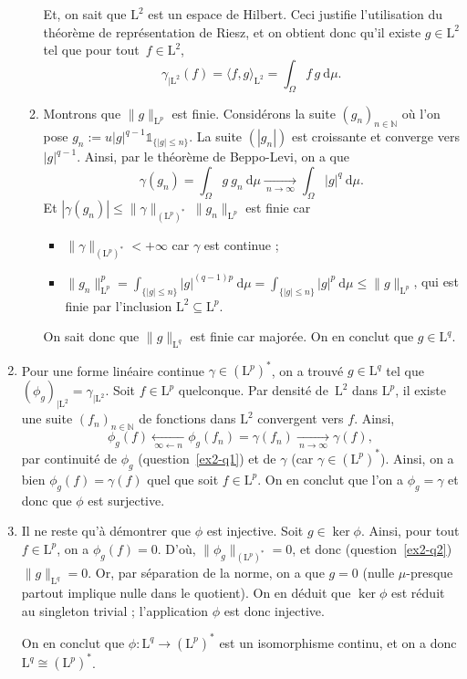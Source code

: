 \documentclass{../../td}
\begin{document}
\begin{enumerate}
\begin{enumerate}
          Et, on sait que  $\mathrm{L}^2$ est un espace de Hilbert.
          Ceci justifie l'utilisation du théorème de représentation de Riesz, et on obtient donc qu'il existe $g \in \mathrm{L}^2$ tel que pour tout~$f \in \mathrm{L}^2$, \[
          \gamma_{|\mathrm{L}^2}(f) = \langle f, g \rangle_{\mathrm{L}^2} = \int_\Omega f\,g\:\mathrm{d}\mu
          .\]
        \item Montrons que $\|g\|_{\mathrm{L}^p}$ est finie.
          Considérons la suite $(g_n)_{n \in \mathds{N}}$ où l'on pose $g_n := u|g|^{q-1} \mathds{1}_{\{|g|\le n\}}$.
          La suite $(|g_n|)$ est croissante et converge vers $|g|^{q-1}$.
          Ainsi, par le théorème de Beppo-Levi, on a que \[
            \gamma(g_n) = \int_\Omega g\:g_n~\mathrm{d}\mu \xrightarrow[\:n\to \infty\:]{}\int_\Omega |g|^q~\mathrm{d}\mu
          .\]
          Et $|\gamma(g_n)| \le \|\gamma\|_{(\mathrm{L}^p)^*}\: \|g_n\|_{\mathrm{L}^p}$ est finie car 
          \begin{itemize}
            \item $\|\gamma\|_{(\mathrm{L}^p)^*} < +\infty$ car $\gamma$ est continue ;
            \item $\|g_n\|_{\mathrm{L}^p}^{p} = \int_{\{|g| \le n\}} |g|^{(q-1)p}\:\mathrm{d}\mu = \int_{\{|g|\le n\}} |g|^p\:\mathrm{d}\mu \le \|g\|_{\mathrm{L}^p}$, qui est finie par l'inclusion $\mathrm{L}^2 \subseteq \mathrm{L}^p$.
          \end{itemize}
          On sait donc que $\|g\|_{\mathrm{L}^q}$ est finie car majorée.
          On en conclut que $g \in \mathrm{L}^q$.
      \end{enumerate}
    \item Pour une forme linéaire continue $\gamma \in (\mathrm{L}^p)^*$, on a trouvé $g \in \mathrm{L}^q$ tel que $(\phi_g)_{|\mathrm{L}^2} = \gamma_{|\mathrm{L}^2}$.
      Soit $f \in \mathrm{L}^p$ quelconque.
      Par densité de~$\mathrm{L}^2$ dans $\mathrm{L}^p$, il existe une suite $(f_n)_{n \in \mathds{N}}$ de fonctions dans $\mathrm{L}^2$ convergent vers $f$.
      Ainsi,  \[
        \phi_g(f)\xleftarrow[\:\infty\gets n\:]{} \phi_g(f_n) = \gamma(f_n) \xrightarrow[\:n\to \infty\:]{} \gamma(f)
      ,\] par continuité de $\phi_g$ (question~\ref{ex2-q1}) et de $\gamma$ (car $\gamma \in (\mathrm{L}^p)^*$).
      Ainsi, on a bien $\phi_g(f) = \gamma(f)$ quel que soit  $f \in \mathrm{L}^p$.
      On en conclut que l'on a $\phi_g = \gamma$ et donc que $\phi$ est surjective. 
    \item Il ne reste qu'à démontrer que $\phi$ est injective.
      Soit $g \in \ker \phi$.
      Ainsi, pour tout $f \in \mathrm{L}^p$, on a $\phi_g(f) = 0$.
      D'où,  $\|\phi_g\|_{(\mathrm{L}^p)^*} = 0$, et donc (question~\ref{ex2-q2}) $\|g\|_{\mathrm{L}^q} = 0$.
      Or, par séparation de la norme, on a que $g = 0$ (nulle $\mu$-presque partout implique nulle dans le quotient). 
      On en déduit que $\ker \phi$ est réduit au singleton trivial ; l'application  $\phi$ est donc injective.

      On en conclut que  $\phi : \mathrm{L}^q \to (\mathrm{L}^p)^*$ est un isomorphisme continu, et on a donc $\mathrm{L}^q \cong (\mathrm{L}^p)^*$.
  \end{enumerate}
\end{document}
